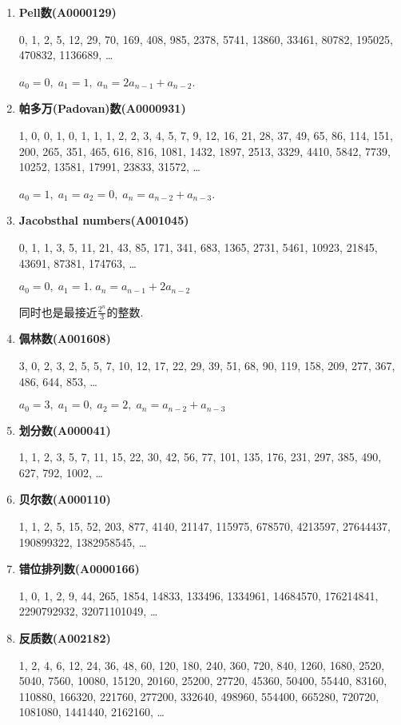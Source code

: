 \begin{enumerate}
\item \textbf{Pell数(A0000129)}

0, 1, 2, 5, 12, 29, 70, 169, 408, 985, 2378, 5741, 13860, 33461, 80782, 195025, 470832, 1136689, \dots

$ a_0 = 0,\; a_1 = 1,\; a_n = 2a_{n - 1} + a_{n - 2} $.

\item \textbf{帕多万(Padovan)数(A0000931)}

1, 0, 0, 1, 0, 1, 1, 1, 2, 2, 3, 4, 5, 7, 9, 12, 16, 21, 28, 37, 49, 65, 86, 114, 151, 200, 265, 351, 465, 616, 816, 1081, 1432, 1897, 2513, 3329, 4410, 5842, 7739, 10252, 13581, 17991, 23833, 31572, \dots

$a_0 = 1,\; a_1 = a_2 = 0,\; a_n = a_{n - 2} + a_{n - 3}$.

\item \textbf{Jacobsthal numbers(A001045)}

0, 1, 1, 3, 5, 11, 21, 43, 85, 171, 341, 683, 1365, 2731, 5461, 10923, 21845, 43691, 87381, 174763, \dots

$ a_0 = 0,\; a_1 = 1.\; a_n = a_{n - 1} + 2a_{n - 2} $

同时也是最接近$\frac {2 ^ n} 3$的整数.

\item \textbf{佩林数(A001608)}

3, 0, 2, 3, 2, 5, 5, 7, 10, 12, 17, 22, 29, 39, 51, 68, 90, 119, 158, 209, 277, 367, 486, 644, 853, \dots

$ a_0 = 3,\; a_1 = 0,\; a_2 = 2,\; a_n = a_{n - 2} + a_{n - 3} $

\item \textbf{划分数(A000041)}

1, 1, 2, 3, 5, 7, 11, 15, 22, 30, 42, 56, 77, 101, 135, 176, 231, 297, 385, 490, 627, 792, 1002, \dots

\item \textbf{贝尔数(A000110)}

1, 1, 2, 5, 15, 52, 203, 877, 4140, 21147, 115975, 678570, 4213597, 27644437, 190899322, 1382958545, \dots

\item \textbf{错位排列数(A0000166)}

1, 0, 1, 2, 9, 44, 265, 1854, 14833, 133496, 1334961, 14684570, 176214841, 2290792932, 32071101049, \dots

\item \textbf{反质数(A002182)}

1, 2, 4, 6, 12, 24, 36, 48, 60, 120, 180, 240, 360, 720, 840, 1260, 1680, 2520, 5040, 7560, 10080, 15120, 20160, 25200, 27720, 45360, 50400, 55440, 83160, 110880, 166320, 221760, 277200, 332640, 498960, 554400, 665280, 720720, 1081080, 1441440, 2162160, \dots


\end{enumerate}
